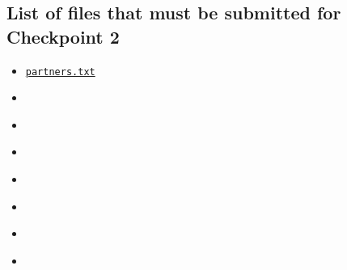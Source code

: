 \subsection*{List of files that must be submitted for Checkpoint 2}

\begin{itemize}
\item \texttt{\hyperlink{cp2partners}{partners.txt}}
\item \texttt{\hyperlink{cp2wep}{\filewep}}
\item \texttt{\hyperlink{cp2wifiip}{\filewifiip}}
\item \texttt{\hyperlink{cp2protocol}{\fileprotocol}}
\item \texttt{\hyperlink{cp2cred}{\filecred}}
\item \texttt{\hyperlink{cp2secret}{\filesecret}}
\item \texttt{\hyperlink{cp2jailtime}{\filejailtime}}
\item \texttt{\hyperlink{cp2anomaly}{\fileanomaly}}
\end{itemize}
